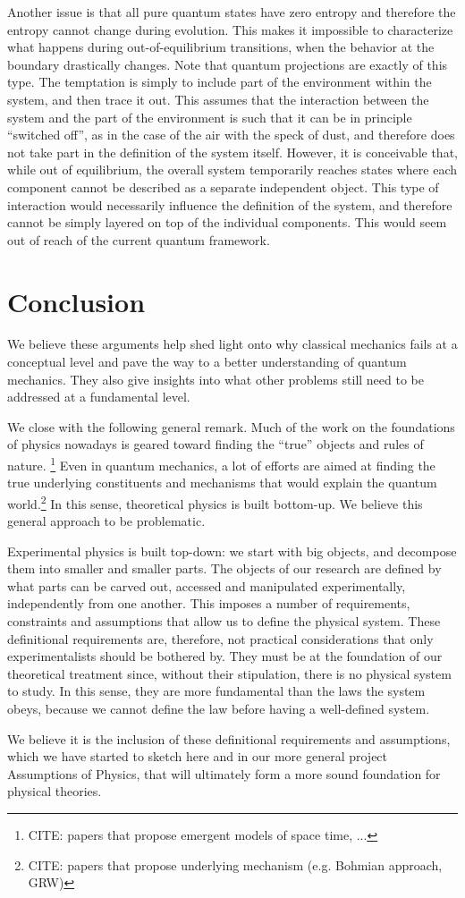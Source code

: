 \documentclass[10pt,twocolumn, nofootinbib]{revtex4-2}
\begin{document}
Another issue is that all pure quantum states have zero entropy and therefore the entropy cannot change during evolution. This makes it impossible to characterize what happens during out-of-equilibrium transitions, when the behavior at the boundary drastically changes. Note that quantum projections are exactly of this type. The temptation is simply to include part of the environment within the system, and then trace it out. This assumes that the interaction between the system and the part of the environment is such that it can be in principle ``switched off'', as in the case of the air with the speck of dust, and therefore does not take part in the definition of the system itself. However, it is conceivable that, while out of equilibrium, the overall system temporarily reaches states where each component cannot be described as a separate independent object. This type of interaction would necessarily influence the definition of the system, and therefore cannot be simply layered on top of the individual components. This would seem out of reach of the current quantum framework.

\section{Conclusion}

We believe these arguments help shed light onto why classical mechanics fails at a conceptual level and pave the way to a better understanding of quantum mechanics. They also give insights into what other problems still need to be addressed at a fundamental level.

We close with the following general remark. Much of the work on the foundations of physics nowadays is geared toward finding the ``true'' objects and rules of nature.\cite{huggett2013emergent,oriti2009approaches,lee2020model} \footnote{CITE: papers that propose emergent models of space time, ...} Even in quantum mechanics, a lot of efforts are aimed at finding the true underlying constituents and mechanisms that would explain the quantum world.\cite{larsson2014loopholes, ghirardi1986unified, carroll2019something, nikolic2007bohmian}\footnote{CITE: papers that propose underlying mechanism (e.g. Bohmian approach, GRW)} In this sense, theoretical physics is built bottom-up. We believe this general approach to be problematic.

Experimental physics is built top-down: we start with big objects, and decompose them into smaller and smaller parts. The objects of our research are defined by what parts can be carved out, accessed and manipulated experimentally, independently from one another. This imposes a number of requirements, constraints and assumptions that allow us to define the physical system. These definitional requirements are, therefore, not practical considerations that only experimentalists should be bothered by. They must be at the foundation of our theoretical treatment since, without their stipulation, there is no physical system to study. In this sense, they are more fundamental than the laws the system obeys, because we cannot define the law before having a well-defined system.

We believe it is the inclusion of these definitional requirements and assumptions, which we have started to sketch here and in our more general project Assumptions of Physics, that will ultimately form a more sound foundation for physical theories.




\end{document}
